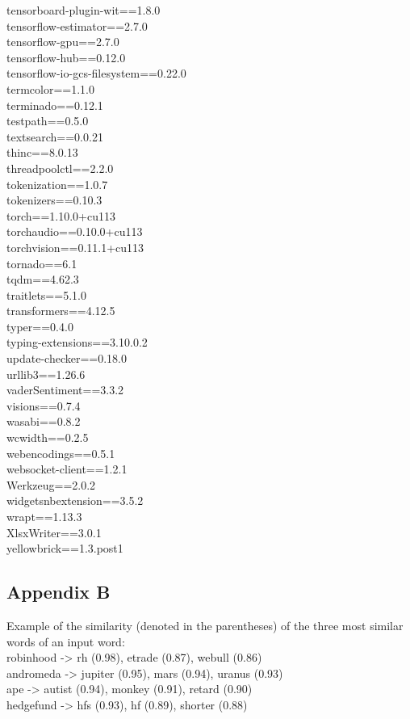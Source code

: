 \documentclass[11pt, a4paper]{article}
\begin{document}
tensorboard-plugin-wit==1.8.0\\
tensorflow-estimator==2.7.0\\
tensorflow-gpu==2.7.0\\
tensorflow-hub==0.12.0\\
tensorflow-io-gcs-filesystem==0.22.0\\
termcolor==1.1.0\\
terminado==0.12.1\\
testpath==0.5.0\\
textsearch==0.0.21\\
thinc==8.0.13\\
threadpoolctl==2.2.0\\
tokenization==1.0.7\\
tokenizers==0.10.3\\
torch==1.10.0+cu113\\
torchaudio==0.10.0+cu113\\
torchvision==0.11.1+cu113\\
tornado==6.1\\
tqdm==4.62.3\\
traitlets==5.1.0\\
transformers==4.12.5\\
typer==0.4.0\\
typing-extensions==3.10.0.2\\
update-checker==0.18.0\\
urllib3==1.26.6\\
vaderSentiment==3.3.2\\
visions==0.7.4\\
wasabi==0.8.2\\
wcwidth==0.2.5\\
webencodings==0.5.1\\
websocket-client==1.2.1\\
Werkzeug==2.0.2\\
widgetsnbextension==3.5.2\\
wrapt==1.13.3\\
XlsxWriter==3.0.1\\
yellowbrick==1.3.post1\\


\subsection{Appendix B}
\label{appendix:B}

Example of the similarity (denoted in the parentheses) of the three most similar words of an input word: \\
robinhood -> rh (0.98), etrade (0.87), webull (0.86) \\
andromeda -> jupiter (0.95), mars (0.94), uranus (0.93) \\
ape -> autist (0.94), monkey (0.91), retard (0.90) \\
hedgefund -> hfs (0.93), hf (0.89), shorter (0.88) \\
\end{document}
